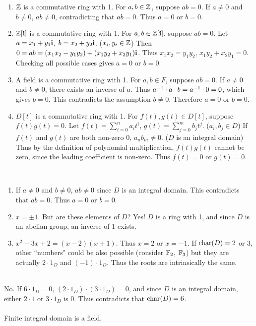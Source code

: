 \begin{enumerate}
	\item $\mathbb{Z}$ is a commutative ring with 1. For $a, b\in \mathbb{Z}$, suppose $ab = 0$. If $a\neq 0$ and $b\neq 0$, $ab \neq 0$, contradicting that $ab=0$. Thus $a=0$ or $b=0$.
	\item $\mathbb{Z}[\bf{i}]$ is a commutative ring with 1. For $a, b\in \mathbb{Z}[\bf{i}]$, suppose $ab = 0$. Let $a = x_1+y_1\bf{i}$, $b = x_2+y_2\bf{i}$. ($x_i, y_i\in \mathbb{Z}$) Then $0 = ab = (x_1x_2-y_1y_2) + (x_1y_2+x_2y_1)\bf{i}$. Thus $x_1x_2 = y_1y_2$, $x_1y_2 + x_2y_1= 0$. Checking all possible cases gives $a = 0$ or $b=0$.
	\item A field is a commutative ring with 1. For $a, b\in F$, suppose $ab = 0$. If $a\neq 0$ and $b\neq 0$, there exists an inverse of $a$. Thus $a^{-1} \cdot a \cdot b = a^{-1} \cdot 0 = 0$, which gives $b=0$. This contradicts the assumption $b\neq 0$. Therefore $a = 0$ or $b = 0$.
	\item $D[t]$ is a commutative ring with 1. For $f(t), g(t)\in D[t]$, suppose $f(t)g(t)=0$. Let $f(t) = \sum_{i=0}^n a_i t^i$, $g(t) = \sum_{j=0}^m b_jt^j$. ($a_i, b_j\in D$) If $f(t)$ and $g(t)$ are both non-zero 0, $a_nb_m\neq 0$. ($D$ is an integral domain) Thus by the definition of polynomial multiplication, $f(t)g(t)$ cannot be zero, since the leading coefficient is non-zero. Thus $f(t) = 0$ or $g(t)=0$.
\end{enumerate}~
\\
\begin{enumerate}
	\item If $a\neq 0$ and $b\neq 0$, $ab\neq 0$ since $D$ is an integral domain. This contradicts that $ab = 0$. Thus $a = 0$ or $b = 0$.
	\item $x = \pm 1$. But are these elements of $D$? Yes! $D$ is a ring with 1, and since $D$ is an abelian group, an inverse of 1 exists.
	\item $x^2-3x+2 = (x-2)(x+1)$. Thus $x = 2$ or $x = -1$. If $\operatorname{char}(D) = 2$ or 3, other ``numbers" could be also possible (consider $\mathbb{F}_2$, $\mathbb{F}_3$) but they are actually $2\cdot 1_D$ and $(-1)\cdot 1_D$. Thus the roots are intrinsically the same.
\end{enumerate}~
\\
 No. If $6\cdot 1_D = 0$, $(2\cdot 1_D)\cdot (3\cdot 1_D) = 0$, and since $D$ is an integral domain, either $2\cdot 1$ or $3\cdot 1_D$ is 0. Thus contradicts that $\operatorname{char}(D) = 6$.\\
\\
 Finite integral domain is a field.\\
